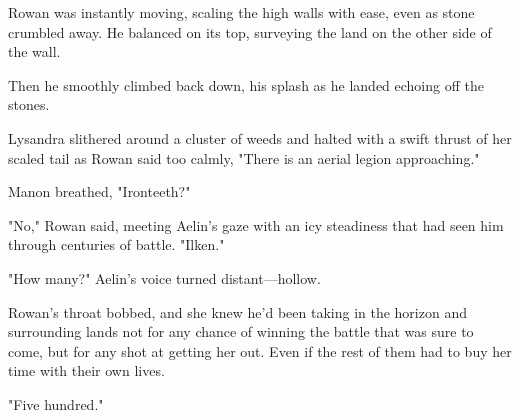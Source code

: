 Rowan was instantly moving, scaling the high walls with ease, even as stone crumbled away.
He balanced on its top, surveying the land on the other side of the wall.

Then he smoothly climbed back down, his splash as he landed echoing off the stones.

Lysandra slithered around a cluster of weeds and halted with a swift thrust of her scaled tail as Rowan said too calmly, "There is an aerial legion approaching."

Manon breathed, "Ironteeth?"

"No," Rowan said, meeting Aelin's gaze with an icy steadiness that had seen him through centuries of battle.
"Ilken."

"How many?"
Aelin's voice turned distant---hollow.

Rowan's throat bobbed, and she knew he'd been taking in the horizon and surrounding lands not for any chance of winning the battle that was sure to come, but for any shot at getting her out.
Even if the rest of them had to buy her time with their own lives.

"Five hundred."
